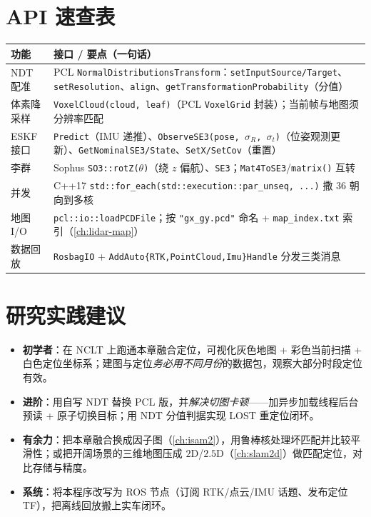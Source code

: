 \section*{API 速查表}
\begin{table}[H]\centering\small
\begin{tabular}{p{} p{}}
\toprule
功能 & 接口 / 要点（一句话） \\
\midrule
NDT 配准 & PCL \texttt{NormalDistributionsTransform}：\texttt{setInputSource/\allowbreak Target}、\texttt{setResolution}、\texttt{align}、\texttt{getTransformationProbability}（分值） \\
体素降采样 & \texttt{VoxelCloud(cloud, leaf)}（PCL \texttt{VoxelGrid} 封装）；当前帧与地图须分辨率匹配 \\
ESKF 接口 & \texttt{Predict}（IMU 递推）、\texttt{ObserveSE3(pose, $\sigma_R$, $\sigma_t$)}（位姿观测更新）、\texttt{GetNominalSE3/\allowbreak State}、\texttt{SetX/SetCov}（重置） \\
李群 & Sophus \texttt{SO3::rotZ(}$\theta$\texttt{)}（绕 $z$ 偏航）、\texttt{SE3}；\texttt{Mat4ToSE3}/\allowbreak\texttt{matrix()} 互转 \\
并发 & C++17 \texttt{std::for\_each(std::execution::par\_unseq, ...)} 撒 $36$ 朝向到多核 \\
地图 I/O & \texttt{pcl::io::loadPCDFile}；按 \texttt{"gx\_gy.\allowbreak pcd"} 命名 + \texttt{map\_index.\allowbreak txt} 索引（\cref{ch:lidar-map}） \\
数据回放 & \texttt{RosbagIO} + \texttt{AddAuto\{RTK,PointCloud,Imu\}Handle} 分发三类消息 \\
\bottomrule
\end{tabular}
\end{table}

\section*{研究实践建议}
\begin{itemize}
  \item \textbf{初学者}：在 NCLT 上跑通本章融合定位，可视化灰色地图 + 彩色当前扫描 + 白色定位坐标系；建图与定位\emph{务必用不同月份}的数据包，观察大部分时段定位有效。
  \item \textbf{进阶}：用自写 NDT 替换 PCL 版，并\emph{解决切图卡顿}——加异步加载线程后台预读 + 原子切换目标；用 NDT 分值判据实现 \textsf{LOST} 重定位闭环。
  \item \textbf{有余力}：把本章融合换成因子图（\cref{ch:isam2}），用鲁棒核处理坏匹配并比较平滑性；或把开阔场景的三维地图压成 $2$D/$2.5$D（\cref{ch:slam2d}）做匹配定位，对比存储与精度。
  \item \textbf{系统}：将本程序改写为 ROS 节点（订阅 RTK/点云/IMU 话题、发布定位 TF），把离线回放搬上实车闭环。
\end{itemize}

